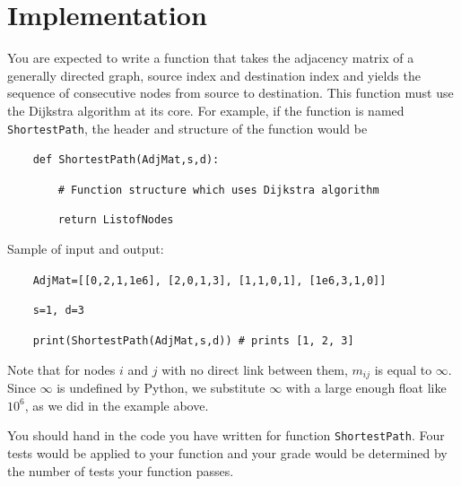 \documentclass[10pt,letterpaper]{article}
\begin{document}
\section{Implementation}

You are expected to write a function that takes the adjacency matrix of a generally directed graph, source index and destination index and yields the sequence of consecutive nodes from source to destination. This function must use the Dijkstra algorithm at its core. For example, if the function is named \texttt{ShortestPath}, the header and structure of the function would be

\texttt{\ \ \ \ def ShortestPath(AdjMat,s,d):}

\texttt{\ \ \ \ $\qquad$\# Function structure which uses Dijkstra algorithm}

\texttt{\ \ \ \ $\qquad$return ListofNodes}

Sample of input and output:

\texttt{\ \ \ \ AdjMat=[[0,2,1,1e6], [2,0,1,3], [1,1,0,1], [1e6,3,1,0]]}

\texttt{\ \ \ \ s=1, d=3}

\texttt{\ \ \ \ print(ShortestPath(AdjMat,s,d)) \# prints [1, 2, 3]}

Note that for nodes $i$ and $j$ with no direct link between them, $m_{ij}$ is equal to $\infty$. Since $\infty$ is undefined by Python, we substitute $\infty$ with a large enough float like $10^6$, as we did in the example above.

You should hand in the code you have written for function \texttt{ShortestPath}. Four tests would be applied to your function and your grade would be determined by the number of tests your function passes.
\end{document}
